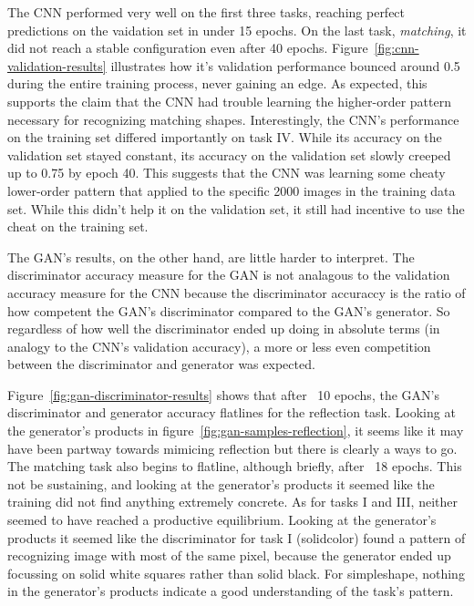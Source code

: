 \documentclass{article}
\renewcommand{\it}{\textit}
\begin{document}
The CNN performed very well on the first three tasks, reaching perfect predictions on the vaidation set in under 15 epochs.
On the last task, \it{matching}, it did not reach a stable configuration even after 40 epochs.
Figure~\ref{fig:cnn-validation-results} illustrates how it's validation performance bounced around 0.5 during the entire training process, never gaining an edge.
As expected, this supports the claim that the CNN had trouble learning the higher-order pattern necessary for recognizing matching shapes.
Interestingly, the CNN's performance on the training set differed importantly on task IV.
While its accuracy on the validation set stayed constant, its accuracy on the validation set slowly creeped up to 0.75 by epoch 40.
This suggests that the CNN was learning some cheaty lower-order pattern that applied to the specific 2000 images in the training data set.
While this didn't help it on the validation set, it still had incentive to use the cheat on the training set.

The GAN's results, on the other hand, are little harder to interpret.
The discriminator accuracy measure for the GAN is not analagous to the validation accuracy measure for the CNN because the discriminator accuraccy is the ratio of how competent the GAN's discriminator compared to the GAN's generator.
So regardless of how well the discriminator ended up doing in absolute terms (in analogy to the CNN's validation accuracy), a more or less even competition between the discriminator and generator was expected.

Figure~\ref{fig:gan-discriminator-results} shows that after ~10 epochs, the GAN's discriminator and generator accuracy flatlines for the reflection task. Looking at the generator's products in figure~\ref{fig:gan-samples-reflection}, it seems like it may have been partway towards mimicing reflection but there is clearly a ways to go.
The matching task also begins to flatline, although briefly, after ~18 epochs.
This not be sustaining, and looking at the generator's products it seemed like the training did not find anything extremely concrete.
As for tasks I and III, neither seemed to have reached a productive equilibrium.
Looking at the generator's products it seemed like the discriminator for task I (solidcolor) found a pattern of recognizing image with most of the same pixel, because the generator ended up focussing on solid white squares rather than solid black.
For simpleshape, nothing in the generator's products indicate a good understanding of the task's pattern.
\end{document}
